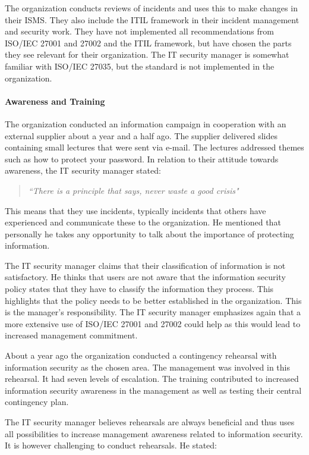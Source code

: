 The organization conducts reviews of incidents and uses this to make changes in their \ac{ISMS}. They also include the \ac{ITIL} framework in their incident management and security work. They have not implemented all recommendations from \acs{ISO}/\acs{IEC} 27001 and 27002 and the \ac{ITIL} framework, but have chosen the parts they see relevant for their organization. The IT security manager is somewhat familiar with \acs{ISO}/\acs{IEC} 27035, but the standard is not implemented in the organization.

\paragraph{Awareness and Training}
The organization conducted an information campaign in cooperation with an external supplier about a year and a half ago. The supplier delivered slides containing small lectures that were sent via e-mail. The lectures addressed themes such as how to protect your password. In relation to their attitude towards awareness, the IT security manager stated: 

\begin{quote}
\textit{``There is a principle that says, never waste a good crisis"}
\end{quote}

This means that they use incidents, typically incidents that others have experienced and communicate these to the organization. He mentioned that personally he takes any opportunity to talk about the importance of protecting information.

The IT security manager claims that their classification of information is not satisfactory. He thinks that users are not aware that the information security policy states that they have to classify the information they process. This highlights that the policy needs to be better established in the organization. This is the manager's responsibility. The IT security manager emphasizes again that a more extensive use of \acs{ISO}/\acs{IEC} 27001 and 27002 could help as this would lead to increased management commitment.

About a year ago the organization conducted a contingency rehearsal with information security as the chosen area. The management was involved in this rehearsal. It had seven levels of escalation. The training contributed to increased information security awareness in the management as well as testing their central contingency plan.

The IT security manager believes rehearsals are always beneficial and thus uses all possibilities to increase management awareness related to information security. It is however challenging to conduct rehearsals. He stated:

